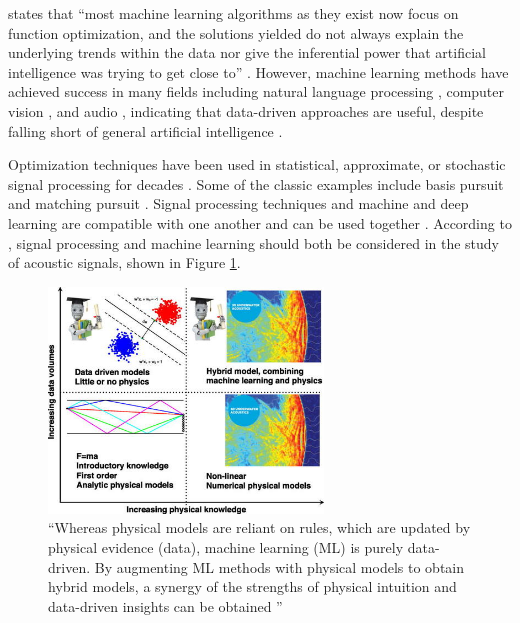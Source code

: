 \documentclass[report.tex]{subfiles}
\begin{document}
\citeauthor{introtodl} states that ``most machine learning algorithms as they exist now focus on function optimization, and the solutions yielded do not always explain the underlying trends within the data nor give the inferential power that artificial intelligence was trying to get close to'' \parencite[1]{introtodl}. However, machine learning methods have achieved success in many fields including natural language processing \parencite{nlpml}, computer vision \parencite{cvml}, and audio \parencite{audiodeeplearning}, indicating that data-driven approaches are useful, despite falling short of general artificial intelligence \parencite{generalai}.

Optimization techniques have been used in statistical, approximate, or stochastic signal processing \parencite{stochasticsp, statisticalsp} for decades \parencite{optsp}. Some of the classic examples include basis pursuit and matching pursuit \parencite{dictionary1, dictionary2}. Signal processing techniques and machine and deep learning are compatible with one another and can be used together \parencite{mlsp1, mlsp2}. According to \citeauthor{mldspmix}, signal processing and machine learning should both be considered in the study of acoustic signals, shown in Figure \ref{fig:dspmlmix}.

\begin{figure}[ht]
	\centering
	\includegraphics[width=0.65\textwidth]{./images-neural/dspmlmix.jpg}
	\caption{``Whereas physical models are reliant on rules, which are updated by physical evidence (data), machine learning (ML) is purely data-driven. By augmenting ML methods with physical models to obtain hybrid models, a synergy of the strengths of physical intuition and data-driven insights can be obtained \parencite[3,591]{mldspmix}''}
	\label{fig:dspmlmix}
\end{figure}
\end{document}
